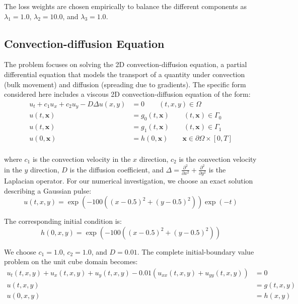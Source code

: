 \noindent  The loss weights are chosen empirically to balance the different components as $\lambda_1 = 1.0$, $\lambda_2 = 10.0$,  and $\lambda_3 = 1.0$.

\subsection{Convection-diffusion Equation}
The problem focuses on solving the 2D convection-diffusion equation, a partial differential equation that models the transport of a quantity under convection (bulk movement) and diffusion (spreading due to gradients). The specific form considered here includes a viscous 2D convection-diffusion equation of the form:
\begin{equation}
\begin{split}
        u_{t} + c_1 u_{x} + c_2 u_{y} - D \Delta u(x,y) &= 0 \qquad (t, x, y) \in \Omega \\
        u(t, \mathbf{x}) &= g_0(t, \mathbf{x}) \qquad (t, \mathbf{x}) \in \Gamma_0 \\
        u(t, \mathbf{x}) &= g_1(t, \mathbf{x}) \qquad (t, \mathbf{x}) \in \Gamma_1 \\
        u(0, \mathbf{x}) &= h(0 , \mathbf{x}) \qquad \mathbf{x} \in \partial \Omega \times [0,T] \\
\end{split}
\end{equation}

\noindent where $c_1$ is the convection velocity in the $x$ direction, $c_2$ is the convection velocity in the $y$ direction, $D$ is the diffusion coefficient, and $\Delta = \frac{\partial^2}{\partial x^2} + \frac{\partial^2}{\partial y^2}$ is the Laplacian operator. For our numerical investigation, we choose an exact solution describing a Gaussian pulse:
\begin{equation}
    u(t, x, y) = \exp(-100((x-0.5)^2 + (y-0.5)^2)) \exp(-t)
\end{equation}


\noindent  The corresponding initial condition is:
\begin{equation}
    h(0,x,y) = \exp(-100((x-0.5)^2 + (y-0.5)^2))
\end{equation}

\noindent We choose $c_1 = 1.0$, $c_2 = 1.0$, and $D = 0.01$.
%
The complete initial-boundary value problem on the unit cube domain becomes:
\begin{equation}
\begin{split}
        u_{t}(t, x, y) + u_{x}(t, x, y) + u_{y}(t, x, y) - 0.01\left( u_{xx}(t, x, y) + u_{yy}(t, x, y) \right) &= 0 \\
        u(t, x, y) &= g(t, x, y) \\
        u(0, x, y) &= h(x, y) \\
\end{split}
\label{eq:Convection-Diffusion}
\end{equation}

